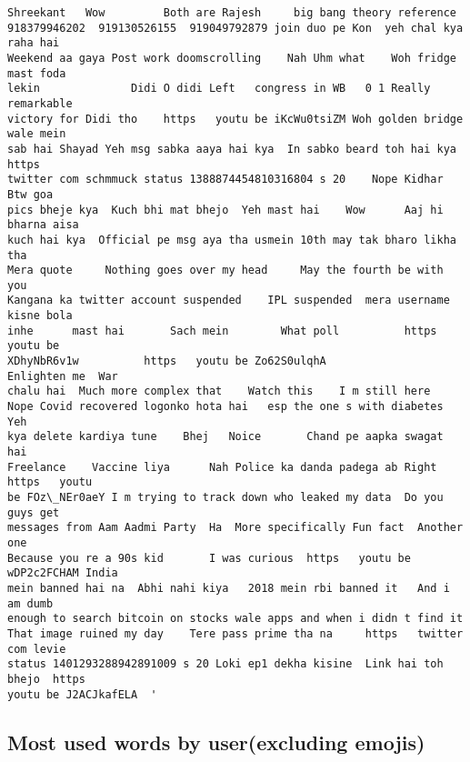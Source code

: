 \documentclass[11pt]{article}
\begin{document}
\begin{tcolorbox}[breakable, size=fbox, boxrule=.5pt, pad at break*=1mm, opacityfill=0]
\begin{Verbatim}[commandchars=\\\{\}]
Shreekant   Wow         Both are Rajesh     big bang theory reference
918379946202  919130526155  919049792879 join duo pe Kon  yeh chal kya raha hai
Weekend aa gaya Post work doomscrolling    Nah Uhm what    Woh fridge mast foda
lekin              Didi O didi Left   congress in WB   0 1 Really remarkable
victory for Didi tho    https   youtu be iKcWu0tsiZM Woh golden bridge wale mein
sab hai Shayad Yeh msg sabka aaya hai kya  In sabko beard toh hai kya  https
twitter com schmmuck status 1388874454810316804 s 20    Nope Kidhar  Btw goa
pics bheje kya  Kuch bhi mat bhejo  Yeh mast hai    Wow      Aaj hi bharna aisa
kuch hai kya  Official pe msg aya tha usmein 10th may tak bharo likha tha
Mera quote     Nothing goes over my head     May the fourth be with you
Kangana ka twitter account suspended    IPL suspended  mera username kisne bola
inhe      mast hai       Sach mein        What poll          https   youtu be
XDhyNbR6v1w          https   youtu be Zo62S0ulqhA             Enlighten me  War
chalu hai  Much more complex that    Watch this    I m still here
Nope Covid recovered logonko hota hai   esp the one s with diabetes        Yeh
kya delete kardiya tune    Bhej   Noice       Chand pe aapka swagat hai
Freelance    Vaccine liya      Nah Police ka danda padega ab Right https   youtu
be FOz\_NEr0aeY I m trying to track down who leaked my data  Do you guys get
messages from Aam Aadmi Party  Ha  More specifically Fun fact  Another one
Because you re a 90s kid       I was curious  https   youtu be wDP2c2FCHAM India
mein banned hai na  Abhi nahi kiya   2018 mein rbi banned it   And i am dumb
enough to search bitcoin on stocks wale apps and when i didn t find it
That image ruined my day    Tere pass prime tha na     https   twitter com levie
status 1401293288942891009 s 20 Loki ep1 dekha kisine  Link hai toh bhejo  https
youtu be J2ACJkafELA  '
\end{Verbatim}
\end{tcolorbox}
        
    \subsection{Most used words by user(excluding
emojis)}\label{most-used-words-by-userexcluding-emojis}
\end{document}
